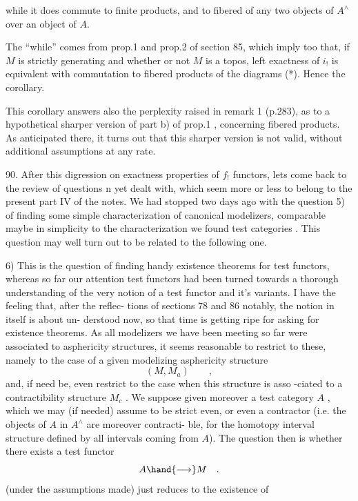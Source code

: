 
while it does commute to finite products, and to fibered  of
any two objects of $A^{\wedge}$ over an object of $A$.

The ``while'' comes from prop.1 and prop.2 of section 85, which
imply too that, if $M$ is strictly generating and whether or not $M$ is a
topos, left exactness of $i_{!}$ is equivalent with commutation to fibered
products of the diagrams (*). Hence the corollary.

This corollary answers also the perplexity raised in remark 1
(p.283), as to a hypothetical sharper version of part b) of prop.1 ,
concerning fibered products. As anticipated there, it turns out that
this sharper version is not valid,  without additional assumptions at
any rate.

90. After this digression on exactness properties of $f_{!}$ functors,
lets come back to the review of  questions n yet dealt with, which
seem more or less to belong to the present part IV of the notes. We
had stopped two days ago with the question 5) of finding some simple
characterization of canonical modelizers, comparable maybe in simplicity
to the characterization we found   test categories . This
question may well turn out to be related to the following one.

6) This is the question of finding handy existence theorems for
test functors, whereas so far our attention   test functors had
been turned towards a thorough understanding of the very notion of a test
functor and it's variants. I have the feeling that, after the reflec-%
tions of sections 78 and 86\unsure{\xout{,}} notably, the notion in itself is about un-%
derstood now, so that time is getting ripe for asking for existence
theorems. As all modelizers we have been meeting so far were associated
to asphericity structures, it seems reasonable to restrict to these,
namely to the case of a given modelizing asphericity structure
\[ (M,M_{a}) \qquad , \]
and, if need be, even restrict to the case when this structure is asso
-ciated to a contractibility structure $M_{c}$ . We suppose given moreover
a test category $A$ , which we may (if needed) assume to be strict even,
or even a contractor (i.e. the objects of $A$ in $A^{\wedge}$ are moreover contracti-%
\margin{\{}ble, for the homotopy interval structure  defined by all intervals coming
from $A$). The question then is whether there exists a test functor
\[ A \hand{\longrightarrow} M \quad . \]
  (under the assumptions made) just reduces to the existence of

